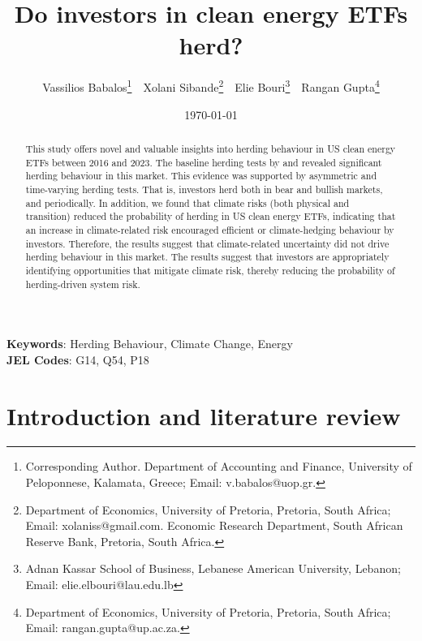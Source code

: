 \documentclass[
  letterpaper,
  DIV=11,
  numbers=noendperiod]{scrartcl}
\author{}
\date{}
\begin{document}
\title{Do investors in clean energy ETFs herd?}



\author{ 
Vassilios Babalos\footnote{Corresponding Author. Department of Accounting and Finance, University of Peloponnese, Kalamata,  Greece; Email: v.babalos@uop.gr.} \,\,
Xolani Sibande\footnote{Department of Economics, University of Pretoria, Pretoria, South Africa; Email: xolaniss@gmail.com. Economic Research Department, South African Reserve Bank, Pretoria, South Africa.} \,\, 
Elie Bouri\footnote{Adnan Kassar School of Business, Lebanese American University, Lebanon; Email: elie.elbouri@lau.edu.lb} \,\,
Rangan Gupta\footnote{Department of Economics, University of Pretoria, Pretoria, South Africa; Email: rangan.gupta@up.ac.za.} 
}
\date{\today}
\maketitle

\begin{abstract}

This study offers novel and valuable insights into herding behaviour in US clean energy ETFs between 2016 and 2023. 
The baseline herding tests by \cite{christie1995} and \cite{chang2000} revealed significant herding behaviour in this market. 
This evidence was supported by asymmetric and time-varying herding tests. That is, investors herd both in bear and bullish markets, and periodically. 
In addition, we found that climate risks (both physical and transition) reduced the probability of herding in US clean energy ETFs, 
indicating that an increase in climate-related risk encouraged efficient or climate-hedging behaviour by investors. 
Therefore, the results suggest that climate-related uncertainty did not drive herding behaviour in this market. The results suggest that investors are appropriately identifying opportunities that mitigate climate risk,
thereby reducing the probability of herding-driven system risk.

\end{abstract}

\noindent\textbf{Keywords}: Herding Behaviour, Climate Change, Energy
\\
\textbf{JEL Codes}: G14, Q54, P18
\newpage

\section{Introduction and literature
review}\label{introduction-and-literature-review}
\end{document}
